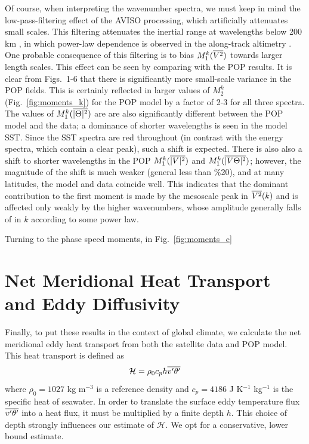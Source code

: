 \documentclass[10pt]{article}
\newcommand{\ol}{\ensuremath{\overline}}
\begin{document}
Of course, when interpreting the wavenumber spectra, we must keep in mind the low-pass-filtering effect of the AVISO processing, which artificially attenuates small scales. This filtering attenuates the inertial range at wavelengths below 200 km \citep{DucetEtAl2000}, in which power-law dependence is observed in the along-track altimetry \citep{XuFu2011}. One probable consequence of this filtering is to bias $M_1^k(\ol{V^2})$ towards larger length scales. This effect can be seen by comparing with the POP results. It is clear from Figs.~1-6 that there is significantly more small-scale variance in the POP fields. This is certainly reflected in larger values of $M_2^k$ (Fig.~\ref{fig:moments_k}) for the POP model by a factor of 2-3 for all three spectra. The values of $M_1^k(\ol{|\Theta|^2})$ are are also significantly different between the POP model and the data; a dominance of shorter wavelengths is seen in the model SST. Since the SST spectra are red throughout (in contrast with the energy spectra, which contain a clear peak), such a shift is expected. There is also also a shift to shorter wavelengths in the POP $M_1^k(\ol{|V|^2})$ and $M_1^k(\ol{|V\Theta|^2})$; however, the magnitude of the shift is much weaker (general less than \%20), and at many latitudes, the model and data coincide well. This indicates that the dominant contribution to the first moment is made by the mesoscale peak in $\ol{V^2}(k)$ and is affected only weakly by the higher wavenumbers, whose amplitude generally falls of in $k$ according to some power law.


\citet{KeatingSmith}

Turning to the phase speed moments, in Fig.~\ref{fig:moments_c}

\section{Net Meridional Heat Transport and Eddy Diffusivity}

Finally, to put these results in the context of global climate, we calculate the net meridional eddy heat transport from both the satellite data and POP model. This heat transport is defined as
\begin{equation}
\mathcal{H} = \rho_0 c_p h \ol{v'\theta'}
\label{eq:H}
\end{equation}
where $\rho_0 = 1027$ kg m$^{-3}$ is a reference density and $c_p = 4186$ J K$^{-1}$ kg$^{-1}$ is the specific heat of seawater. In order to translate the surface eddy temperature flux $\ol{v'\theta'}$ into a heat flux, it must be multiplied by a finite depth $h$. This choice of depth strongly influences our estimate of $\mathcal{H}$. We opt for a conservative, lower bound estimate.
\end{document}
